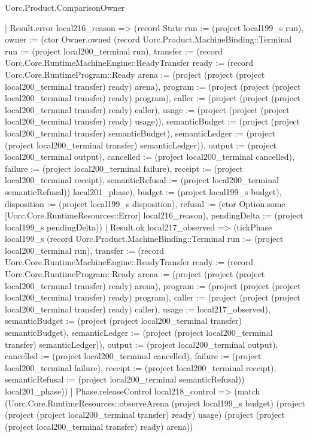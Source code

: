 \begin{lexlean}{Uorc.Product.ComparisonOwner}
\begin{semanticmodule}
{      | Result.error local216_reason => (record State {run := (project local199_s run), owner := (ctor Owner.owned (record Uorc.Product.MachineBinding::Terminal {run := (project local200_terminal run), transfer := (record Uorc.Core.RuntimeMachineEngine::ReadyTransfer {ready := (record Uorc.Core.RuntimeProgram::Ready {arena := (project (project (project local200_terminal transfer) ready) arena), program := (project (project (project local200_terminal transfer) ready) program), caller := (project (project (project local200_terminal transfer) ready) caller), usage := (project (project (project local200_terminal transfer) ready) usage)}), semanticBudget := (project (project local200_terminal transfer) semanticBudget), semanticLedger := (project (project local200_terminal transfer) semanticLedger)}), output := (project local200_terminal output), cancelled := (project local200_terminal cancelled), failure := (project local200_terminal failure), receipt := (project local200_terminal receipt), semanticRefusal := (project local200_terminal semanticRefusal)}) local201_phase), budget := (project local199_s budget), disposition := (project local199_s disposition), refusal := (ctor Option.some [Uorc.Core.RuntimeResources::Error] local216_reason), pendingDelta := (project local199_s pendingDelta)})
      | Result.ok local217_observed => (tickPhase local199_s (record Uorc.Product.MachineBinding::Terminal {run := (project local200_terminal run), transfer := (record Uorc.Core.RuntimeMachineEngine::ReadyTransfer {ready := (record Uorc.Core.RuntimeProgram::Ready {arena := (project (project (project local200_terminal transfer) ready) arena), program := (project (project (project local200_terminal transfer) ready) program), caller := (project (project (project local200_terminal transfer) ready) caller), usage := local217_observed}), semanticBudget := (project (project local200_terminal transfer) semanticBudget), semanticLedger := (project (project local200_terminal transfer) semanticLedger)}), output := (project local200_terminal output), cancelled := (project local200_terminal cancelled), failure := (project local200_terminal failure), receipt := (project local200_terminal receipt), semanticRefusal := (project local200_terminal semanticRefusal)}) local201_phase))
    | Phase.releaseControl local218_control => (match (Uorc.Core.RuntimeResources::observeArena (project local199_s budget) (project (project (project local200_terminal transfer) ready) usage) (project (project (project local200_terminal transfer) ready) arena))
}
\end{semanticmodule}
\end{lexlean}
